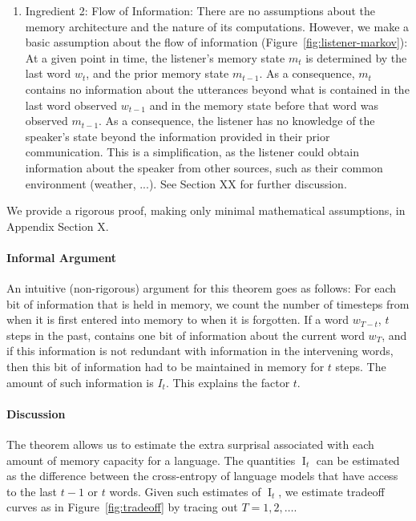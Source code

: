 \begin{enumerate}
\item Ingredient 2: Flow of Information: There are no assumptions about the memory architecture and the nature of its computations.
However, we make a basic assumption about the flow of information (Figure~\ref{fig:listener-markov}):
At a given point in time, the listener's memory state $m_t$ is determined by the last word $w_t$, and the prior memory state $m_{t-1}$.
As a consequence, $m_t$ contains no information about the utterances beyond what is contained in the last word observed $w_{t-1}$ and in the memory state before that word was observed $m_{t-1}$.
As a consequence, the listener has no knowledge of the speaker's state beyond the information provided in their prior communication.
This is a simplification, as the listener could obtain information about the speaker from other sources, such as their common environment (weather, ...).
See Section XX for further discussion.
\end{enumerate}






We provide a rigorous proof, making only minimal mathematical assumptions, in Appendix Section X.

\paragraph{Informal Argument}
An intuitive (non-rigorous) argument for this theorem goes as follows:
For each bit of information that is held in memory, we count the number of timesteps from when it is first entered into memory to when it is forgotten.
If a word $w_{T-t}$, $t$ steps in the past, contains one bit of information about the current word $w_T$, and if this information is not redundant with information in the intervening words, then this bit of information had to be maintained in memory for $t$ steps.
The amount of such information is $I_t$. This explains the factor $t$.


\paragraph{Discussion}
The theorem allows us to estimate the extra surprisal associated with each amount of memory capacity for a language.
The quantities $\operatorname{I}_t$ can be estimated as the difference between the cross-entropy of language models that have access to the last $t-1$ or $t$ words.
Given such estimates of $\operatorname{I}_t$, we estimate tradeoff curves as in Figure~\ref{fig:tradeoff} by tracing out $T=1, 2, \dots$.


